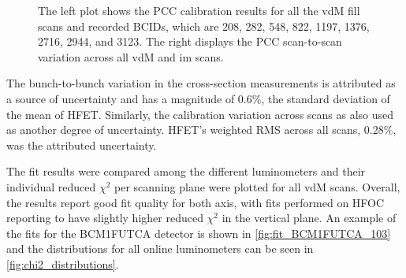 \begin{figure}[!htb]
	\centering
	\caption[PCC calibration results]{The left plot shows the PCC calibration results for all the vdM fill scans and recorded BCIDs, which are 208, 282, 548, 822, 1197, 1376, 2716, 2944, and 3123. The right displays the PCC scan-to-scan variation across all vdM and im scans.
	}
	\label{fig:cross_section_results_pcc}
\end{figure}

The bunch-to-bunch variation in the cross-section measurements is attributed as a source of uncertainty and has a magnitude of 0.6\%, the standard deviation of the mean of HFET. Similarly, the calibration variation across scans as also used as another degree of uncertainty. HFET's weighted RMS across all scans, 0.28\%, was the attributed uncertainty.

The fit results were compared among the different luminometers and their individual reduced $\chi^2$ per scanning plane were plotted for all vdM scans. Overall, the results report good fit quality for both axis, with fits performed on HFOC reporting to have slightly higher reduced $\chi^2$ in the vertical plane. An example of the fits for the BCM1FUTCA detector is shown in \autoref{fig:fit_BCM1FUTCA_103} and the distributions for all online luminometers can be seen in \autoref{fig:chi2_distributions}.

